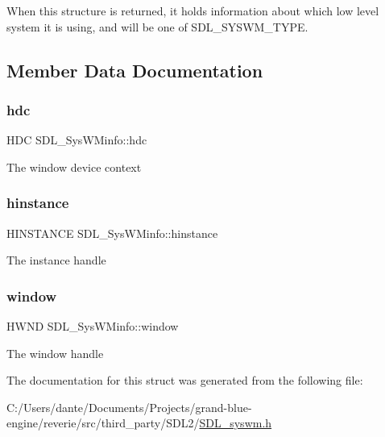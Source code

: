When this structure is returned, it holds information about which low level system it is using, and will be one of S\+D\+L\+\_\+\+S\+Y\+S\+W\+M\+\_\+\+T\+Y\+PE. 

\subsection{Member Data Documentation}
\mbox{\label{struct_s_d_l___sys_w_minfo_a5c9d0745b083422834681e99c38b803e}} 
\subsubsection{\texorpdfstring{hdc}{hdc}}
{\footnotesize\ttfamily H\+DC S\+D\+L\+\_\+\+Sys\+W\+Minfo\+::hdc}

The window device context \mbox{\label{struct_s_d_l___sys_w_minfo_ae3e93d21e2b20b2069f5f7d5308194f1}} 
\subsubsection{\texorpdfstring{hinstance}{hinstance}}
{\footnotesize\ttfamily H\+I\+N\+S\+T\+A\+N\+CE S\+D\+L\+\_\+\+Sys\+W\+Minfo\+::hinstance}

The instance handle \mbox{\label{struct_s_d_l___sys_w_minfo_af06225591ff07e837bbd037728a525b9}} 
\subsubsection{\texorpdfstring{window}{window}}
{\footnotesize\ttfamily H\+W\+ND S\+D\+L\+\_\+\+Sys\+W\+Minfo\+::window}

The window handle 

The documentation for this struct was generated from the following file\+:\begin{DoxyCompactItemize}
\item 
C\+:/\+Users/dante/\+Documents/\+Projects/grand-\/blue-\/engine/reverie/src/third\+\_\+party/\+S\+D\+L2/\mbox{\hyperlink{_s_d_l__syswm_8h}{S\+D\+L\+\_\+syswm.\+h}}\end{DoxyCompactItemize}
